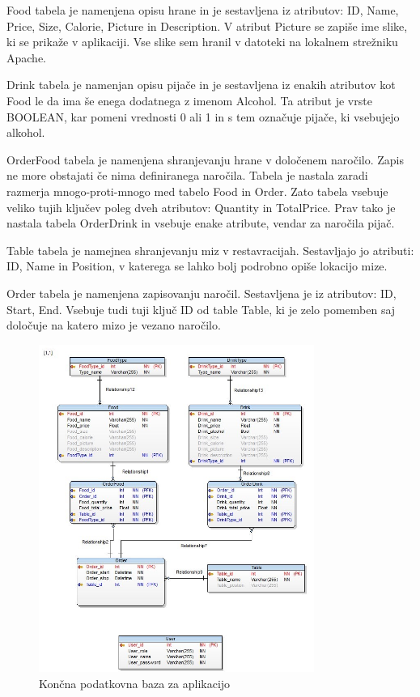 \documentclass[a4paper, 12pt]{book}
\begin{document}
Food tabela je namenjena opisu hrane in je sestavljena iz atributov: ID, Name, Price, Size, Calorie, Picture in Description.  V atribut Picture se zapiše ime slike, ki se prikaže v aplikaciji. Vse slike sem hranil v datoteki na lokalnem strežniku Apache.

Drink tabela je namenjan opisu pijače in je sestavljena iz enakih atributov kot Food le da ima še enega dodatnega z imenom Alcohol. Ta atribut je vrste BOOLEAN, kar pomeni  vrednosti 0 ali 1 in s tem označuje pijače, ki vsebujejo alkohol.

OrderFood tabela je namenjena shranjevanju hrane v določenem naročilo. Zapis ne more obstajati če nima definiranega naročila. Tabela je nastala zaradi razmerja mnogo-proti-mnogo med tabelo Food in Order. Zato tabela vsebuje veliko tujih ključev poleg dveh atributov: Quantity in TotalPrice. Prav tako je nastala tabela OrderDrink in vsebuje enake atribute, vendar za naročila pijač.

Table tabela je namejnea shranjevanju miz v restavracijah. Sestavljajo jo atributi: ID, Name in Position, v katerega se lahko bolj podrobno opiše lokacijo mize.

Order tabela je namenjena zapisovanju naročil. Sestavljena je iz atributov: ID, Start, End. Vsebuje tudi tuji ključ ID od table Table, ki je zelo pomemben saj določuje na katero mizo je vezano naročilo.
\begin{figure}[h]
\begin{center}
\includegraphics[width=9cm]{Database_physical}
\end{center}
\caption{Končna podatkovna baza za aplikacijo}
\label{Database_physical}
\end{figure}
\end{document}
